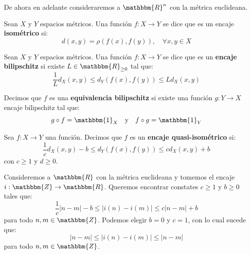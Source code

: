 \documentclass[12pt]{report}
\newcounter{it}
\theoremstyle{largebreak}
\newcommand\abs[1]{\ensuremath{\left|#1\right|}}
\newcommand\cf[3]{\ensuremath{#1:#2\rightarrow#3}}
\newcommand{\bbm}[1]{\ensuremath{\mathbbm{#1}}}
\begin{document}
    \begin{obs}
        De ahora en adelante consideraremos a $\bbm{R}^n$ con la métrica euclideana.
    \end{obs}

    \begin{mydef}
        Sean $X$ y $Y$ espacios métricos. Una función $\cf{f}{X}{Y}$ se dice que es un encaje \textbf{isométrico} si:
        \begin{equation*}
            d(x,y)=\rho(f(x),f(y)),\quad\forall x,y\in X
        \end{equation*}
    \end{mydef}

    \begin{mydef}
        Sean $X$ y $Y$ espacios métricos. Una función $\cf{f}{X}{Y}$ se dice que es un \textbf{encaje bilipschitz} si existe $L\in\bbm{R}_{\geq0}$ tal que:
        \begin{equation*}
            \frac{1}{L}d_X(x,y)\leq d_Y(f(x),f(y))\leq Ld_X(x,y)
        \end{equation*}

        Decimos que $f$ es una \textbf{equivalencia bilipschitz} si existe una función $\cf{g}{Y}{X}$ encaje bilipschitz tal que:
        \begin{equation*}
            g\circ f=\bbm{1}_X\quad\textup{y}\quad f\circ g=\bbm{1}_Y
        \end{equation*}
    \end{mydef}

    \begin{mydef}
        Sea $\cf{f}{X}{Y}$ una función. Decimos que $f$ es un \textbf{encaje quasi-isométrico} si:
        \begin{equation*}
            \frac{1}{c}d_X(x,y)-b\leq d_Y(f(x),f(y))\leq cd_X(x,y)+b
        \end{equation*}
        con $c\geq1$ y $d\geq0$.
    \end{mydef}

    \newcommand{\floor}[1]{\ensuremath{\lfloor #1\rfloor}}

    \begin{exa}
        Consideremos a $\bbm{R}$ con la métrica euclideana y tomemos el encaje $\cf{i}{\bbm{Z}}{\bbm{R}}$. Queremos encontrar constates $c\geq1$ y $b\geq0$ tales que:
        \begin{equation*}
            \frac{1}{c}\abs{n-m}-b\leq\abs{i(n)-i(m)}\leq c\abs{n-m}+b
        \end{equation*}
        para todo $n,m\in\bbm{Z}$. Podemos elegir $b=0$ y $c=1$, con lo cual sucede que:
        \begin{equation*}
            \abs{n-m}\leq\abs{i(n)-i(m)}\leq \abs{n-m}
        \end{equation*}
        para todo $n,m\in\bbm{Z}$.
    \end{exa}
\end{document}

